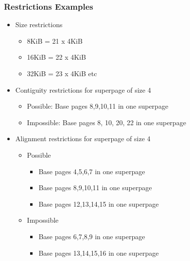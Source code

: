 \documentclass[12pt]{article}
\begin{document}
\subsubsection{Restrictions Examples}
\begin{itemize}
    \item Size restrictions \begin{itemize}
        \item 8KiB = 21 x 4KiB
        \item 16KiB = 22 x 4KiB
        \item 32KiB = 23 x 4KiB etc
    \end{itemize}
    \item Contiguity restrictions for superpage of size 4 \begin{itemize}
        \item Possible: Base pages 8,9,10,11 in one superpage
        \item Impossible: Base pages 8, 10, 20, 22 in one superpage
    \end{itemize}
    \item Alignment restrictions for superpage of size 4 \begin{itemize}
        \item Possible \begin{itemize}
            \item Base pages 4,5,6,7 in one superpage
            \item Base pages 8,9,10,11 in one superpage
            \item Base pages 12,13,14,15 in one superpage
        \end{itemize}
        \item Impossible \begin{itemize}
            \item Base pages 6,7,8,9 in one superpage
            \item Base pages 13,14,15,16 in one superpage
        \end{itemize}
    \end{itemize}
\end{itemize}
\end{document}
